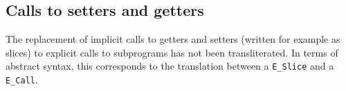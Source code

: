 \documentclass{book}
\begin{document}









\subsection{Calls to setters and getters}
The replacement of implicit calls to getters and setters (written for example as
slices) to explicit calls to subprograms has not been transliterated.
%
In terms of abstract syntax, this corresponds to the translation between a
\texttt{E\_Slice} and a \texttt{E\_Call}.
\end{document}
